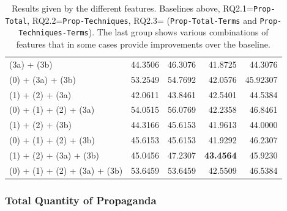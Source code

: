 \begin{table}[!htbp]
\begin{tabular}{l|rr|rr}
        (3a) + (3b) & 44.3506 & 46.3076 & 41.8725 & 44.3076 \\
        (0) + (3a) + (3b) & 53.2549 & 54.7692 & 42.0576 & 45.92307 \\
        (1) + (2) + (3a) & 42.0611 & 43.8461 & 42.5401 & 44.5384 \\
        (0) + (1) + (2) + (3a) & 54.0515 & 56.0769 & 42.2358 & 46.8461 \\
        (1) + (2) + (3b) & 44.3166 & 45.6153 & 41.9613 & 44.0000 \\
        (0) + (1) + (2) + (3b) & 45.6153 & 45.6153 & 41.9292 & 46.2307 \\
        (1) + (2) + (3a) + (3b) & 45.0456 & 47.2307 & \textbf{43.4564} & 45.9230 \\
        (0) + (1) + (2) + (3a) + (3b) & 53.6459 & 53.6459 & 42.5509 & 46.5384 \\
        
    \end{tabular}
    \caption{Results given by the different features. Baselines above, RQ2.1=\texttt{Prop-Total}, RQ2.2=\texttt{Prop-Techniques}, RQ2.3= (\texttt{Prop-Total-Terms} and \texttt{Prop-Techniques-Terms}). The last group shows various combinations of features that in some cases provide improvements over the baseline.}
    \label{tab:results_prop_features_classifier}
\end{table}


\subsubsection{Total Quantity of Propaganda}


